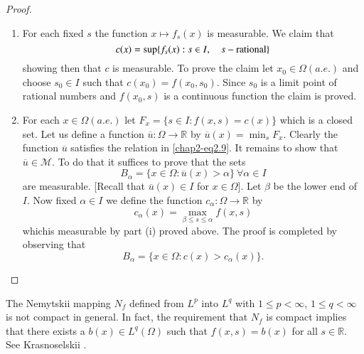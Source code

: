 \begin{proof}
\begin{enumerate}
\renewcommand{\theenumi}{\roman{enumi}}
\renewcommand{\labelenumi}{(\theenumi)}
\item For each fixed $s$ the function $x\mapsto f_{s}(x)$ is
  measurable. We claim that
$$
c(x)=\sup \{f_{s}(x):s\in I,\quad s-\text{rational}\}
$$
showing then that $c$ is measurable. To prove the claim let $x_{0}\in
\Omega(a.e.)$ and choose $s_{0}\in I$ such that
$c(x_{0})=f(x_{0},s_{0})$. Since $s_{0}$ is a limit point of rational
numbers and $f(x_{0},s)$ is a continuous function the claim is proved.

\item For each $x\in\Omega(a.e.)$ let $F_{x}=\{s\in I:f(x,s)=c(x)\}$
  which is a closed set. Let us define a function
  $\overline{u}:\Omega\to \mathbb{R}$ by
  $\overline{u}(x)=\min_{s}F_{x}$. Clearly the function $\overline{u}$
  satisfies the relation in \eqref{chap2-eq2.9}. It remains to show
  that $\overline{u}\in \mathcal{M}$. To do that it suffices to prove
  that the sets
$$
B_{\alpha}=\{x\in \Omega:\overline{u}(x)>\alpha\}\ \forall \alpha \in
I
$$
are measurable. [Recall that $\overline{u}(x)\in I$ for $x\in
  \Omega$]. Let $\beta$ be the lower end of $I$. Now fixed $\alpha\in
I$ we define the function $c_{\alpha}:\Omega\to \mathbb{R}$ by
$$
c_{\alpha}(x)=\max\limits_{\beta\leq s\leq \alpha}f(x,s)
$$
which\pageoriginale is measurable by part (i) proved above. The proof
is completed by observing that
$$
B_{\alpha}=\{x\in \Omega:c(x)>c_{\alpha}(x)\}.
$$
\end{enumerate}
\end{proof}

\begin{remark*}
The Nemytskii mapping $N_{f}$ defined from $L^{p}$ into $L^{q}$ with
$1\leq p<\infty$, $1\leq q<\infty$ is not compact in general. In fact,
the requirement that $N_{f}$ is compact implies that there exists
a $b(x)\in L^{q}(\Omega)$ such that $f(x,s)=b(x)$ for all $s\in
\mathbb{R}$. See Krasnoselskii \cite{key53}.
\end{remark*}

